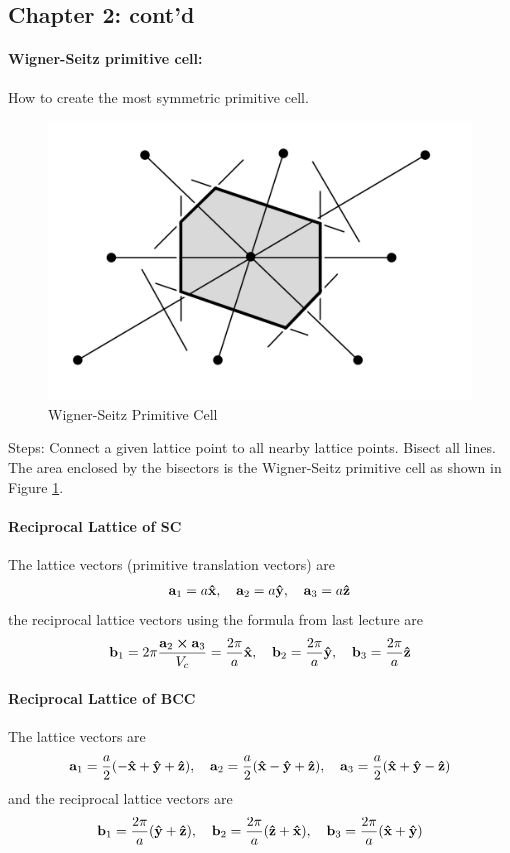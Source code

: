 \documentclass[../main.tex]{subfiles}
\begin{document}
\subsection*{Chapter 2: cont'd}

\paragraph{Wigner-Seitz primitive cell:} How to create the most symmetric primitive cell.

\begin{figure}[ht]
    \centering
    \includegraphics[width=0.4\linewidth]{pcell.png}
    \caption{Wigner-Seitz Primitive Cell}
    \label{fig:3.1}
\end{figure}
Steps: Connect a given lattice point to all nearby lattice points. Bisect all lines. The area 
enclosed by the bisectors is the Wigner-Seitz primitive cell as shown in Figure \ref{fig:3.1}.

\paragraph{Reciprocal Lattice of SC} The lattice vectors (primitive translation vectors) are
\begin{align*}
    \vb{a}_1 = a\vu{x}, \quad \vb{a}_2 = a\vu{y}, \quad \vb{a}_3 = a\vu{z}
\end{align*}
the reciprocal lattice vectors using the formula from last lecture are
\begin{align*}
    \vb{b}_1 = 2\pi \frac{\vb{a}_2 \cross \vb{a}_3}{V_c} = \frac{2\pi}{a}\vu{x}, \quad
    \vb{b}_2 = \frac{2\pi}{a}\vu{y}, \quad \vb{b}_3 = \frac{2\pi}{a}\vu{z}
\end{align*}

\paragraph{Reciprocal Lattice of BCC} The lattice vectors are
\begin{align*}
    \vb{a}_1 = \frac{a}{2}(-\vu{x} + \vu{y} + \vu{z}), \quad
    \vb{a}_2 = \frac{a}{2}(\vu{x} - \vu{y} + \vu{z}), \quad
    \vb{a}_3 = \frac{a}{2}(\vu{x} + \vu{y} - \vu{z})
\end{align*}
and the reciprocal lattice vectors are
\begin{align*}
    \vb{b}_1 = \frac{2\pi}{a}(\vu{y} + \vu{z}), \quad
    \vb{b}_2 = \frac{2\pi}{a}(\vu{z} + \vu{x}), \quad
    \vb{b}_3 = \frac{2\pi}{a}(\vu{x} + \vu{y})
\end{align*}
\end{document}

